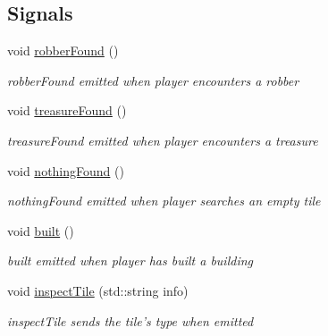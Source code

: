 \subsection*{Signals}
\begin{DoxyCompactItemize}
\item 
\hypertarget{class_game_1_1_map_a1ae4376a50d7234a5d56cd66ff9686d9}{void \hyperlink{class_game_1_1_map_a1ae4376a50d7234a5d56cd66ff9686d9}{robber\-Found} ()}\label{class_game_1_1_map_a1ae4376a50d7234a5d56cd66ff9686d9}

\begin{DoxyCompactList}\small\item\em robber\-Found emitted when player encounters a robber \end{DoxyCompactList}\item 
\hypertarget{class_game_1_1_map_ac966080c6fe166edf48f150331a6d699}{void \hyperlink{class_game_1_1_map_ac966080c6fe166edf48f150331a6d699}{treasure\-Found} ()}\label{class_game_1_1_map_ac966080c6fe166edf48f150331a6d699}

\begin{DoxyCompactList}\small\item\em treasure\-Found emitted when player encounters a treasure \end{DoxyCompactList}\item 
\hypertarget{class_game_1_1_map_a00eae9638e9b5066954d81b5a8100443}{void \hyperlink{class_game_1_1_map_a00eae9638e9b5066954d81b5a8100443}{nothing\-Found} ()}\label{class_game_1_1_map_a00eae9638e9b5066954d81b5a8100443}

\begin{DoxyCompactList}\small\item\em nothing\-Found emitted when player searches an empty tile \end{DoxyCompactList}\item 
\hypertarget{class_game_1_1_map_a5672c918010de381ccfca5a82a1a1c6a}{void \hyperlink{class_game_1_1_map_a5672c918010de381ccfca5a82a1a1c6a}{built} ()}\label{class_game_1_1_map_a5672c918010de381ccfca5a82a1a1c6a}

\begin{DoxyCompactList}\small\item\em built emitted when player has built a building \end{DoxyCompactList}\item 
void \hyperlink{class_game_1_1_map_ac2461e5dd8dc2ac1e55e727158568a46}{inspect\-Tile} (std\-::string info)
\begin{DoxyCompactList}\small\item\em inspect\-Tile sends the tile's type when emitted \end{DoxyCompactList}\end{DoxyCompactItemize}
